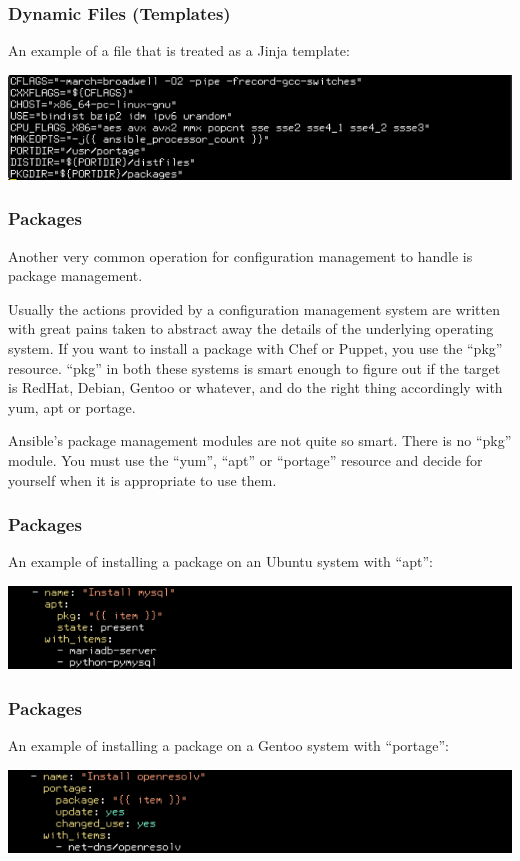 \documentclass[helvetica,english,utf8,notitle,nologo]{beamer}
\begin{document}
\begin{frame}
  \frametitle{Dynamic Files (Templates)}

  An example of a file that is treated as a Jinja template:

  \includegraphics[scale=0.44]{img_22}
\end{frame}

\begin{frame}
  \frametitle{Packages}

  Another very common operation for configuration management to handle
  is package management.

  Usually the actions provided by a configuration management system
  are written with great pains taken to abstract away the details of
  the underlying operating system. If you want to install a package
  with Chef or Puppet, you use the ``pkg'' resource. ``pkg'' in both
  these systems is smart enough to figure out if the target is RedHat,
  Debian, Gentoo or whatever, and do the right thing accordingly with
  yum, apt or portage.

  Ansible's package management modules are not quite so smart. There
  is no ``pkg'' module. You must use the ``yum'', ``apt'' or
  ``portage'' resource and decide for yourself when it is appropriate
  to use them.
\end{frame}

\begin{frame}
  \frametitle{Packages}

  An example of installing a package on an Ubuntu system with ``apt'':

  \includegraphics[scale=0.44]{img_23}
\end{frame}

\begin{frame}
  \frametitle{Packages}

  An example of installing a package on a Gentoo system with
  ``portage'':

  \includegraphics[scale=0.44]{img_24}
\end{frame}
\end{document}
